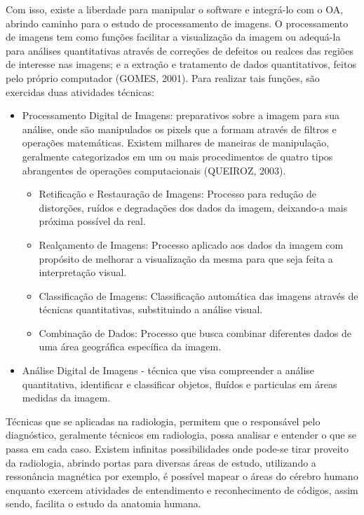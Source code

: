 \documentclass[12pt,openright,oneside,a4paper,english,french,spanish,brazil]{unifil}
\begin{document}
Com isso, existe a liberdade para manipular o software e integrá-lo com o OA, abrindo caminho para o estudo de processamento de imagens. O processamento de imagens tem como funções facilitar a visualização da imagem ou adequá-la para análises quantitativas através de correções de defeitos ou realces das regiões de interesse nas imagens; e a extração e tratamento de dados quantitativos, feitos pelo próprio computador (GOMES, 2001). Para realizar tais funções, são exercidas duas atividades técnicas:
\begin{itemize}
\item Processamento Digital de Imagens: preparativos sobre a imagem para sua análise, onde são manipulados os pixels que a formam através de filtros e operações matemáticas. Existem milhares de maneiras de manipulação, geralmente categorizados em um ou mais procedimentos de quatro tipos abrangentes de operações computacionais (QUEIROZ, 2003).
\begin{itemize}
\item Retificação e Restauração de Imagens: Processo para redução de distorções, ruídos e degradações dos dados da imagem, deixando-a mais próxima possível da real.
\item Realçamento de Imagens: Processo aplicado aos dados da imagem com propósito de melhorar a visualização da mesma para que seja feita a interpretação visual.
\item Classificação de Imagens: Classificação automática das imagens através de técnicas quantitativas, substituindo a análise visual.
\item Combinação de Dados: Processo que busca combinar diferentes dados de uma área geográfica específica da imagem.
\end{itemize}

\item Análise Digital de Imagens - técnica que visa compreender a análise quantitativa, identificar e classificar objetos, fluídos e particulas em áreas medidas da imagem. 
\end{itemize}
Técnicas que se aplicadas na radiologia, permitem que o responsável pelo diagnóstico, geralmente técnicos em radiologia, possa analisar e entender o que se passa em cada caso. Existem infinitas possibilidades onde pode-se tirar proveito da radiologia, abrindo portas para diversas áreas de estudo, utilizando a ressonância magnética por exemplo,  é possível mapear o áreas do cérebro humano enquanto exercem atividades de entendimento e reconhecimento de códigos, assim sendo, facilita o estudo da anatomia humana.
\end{document}
